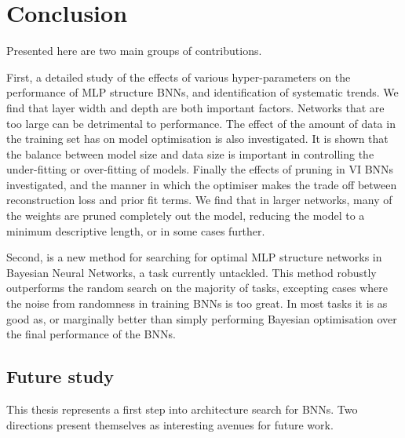 
\chapter{Conclusion}
\label{ch:future_study}

\ifpdf
    \graphicspath{{Chapter6/Figs/Raster/}{Chapter6/Figs/PDF/}{Chapter6/Figs/}}
\else
    \graphicspath{{Chapter6/Figs/Vector/}{Chapter6/Figs/}}
\fi

Presented here are two main groups of contributions. 

First, a detailed study of the effects of various hyper-parameters on the performance of MLP structure BNNs, and identification of systematic trends. We find that layer width and depth are both important factors. Networks that are too large can be detrimental to performance. The effect of the amount of data in the training set has on model optimisation is also investigated. It is shown that the balance between model size and data size is important in controlling the under-fitting or over-fitting of models. Finally the effects of pruning in VI BNNs investigated, and the manner in which the optimiser makes the trade off between reconstruction loss and prior fit terms. We find that in larger networks, many of the weights are pruned completely out the model, reducing the model to a minimum descriptive length, or in some cases further.

Second, is a new method for searching for optimal MLP structure networks in Bayesian Neural Networks, a task currently untackled. This method robustly outperforms the random search on the majority of tasks, excepting cases where the noise from randomness in training BNNs is too great. In most tasks it is as good as, or marginally better than simply performing Bayesian optimisation over the final performance of the BNNs.

\section{Future study}

This thesis represents a first step into architecture search for BNNs. Two directions present themselves as interesting avenues for future work. 


